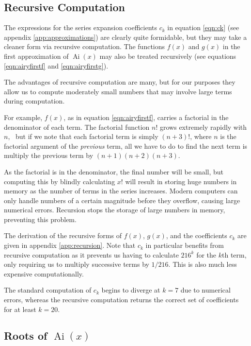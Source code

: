 \documentclass[]{article}
\newcommand{\Ai}[1]{\ensuremath{\operatorname{Ai}({#1})}}
\begin{document}
\subsection{Recursive Computation}\label{ssec:recursion}

The expressions for the series expansion coefficients $c_{k}$ in equation \ref{eqn:ck} (see appendix \ref{app:approximations}) are clearly quite formidable, but they may take a cleaner form via recursive computation. The functions $f(x)$ and $g(x)$ in the first approximation of $\Ai{x}$ may also be treated recursively (see equations \ref{eqn:airyfirstf} and \ref{eqn:airyfirstg}).

The advantages of recursive computation are many, but for our purposes they allow us to compute moderately small numbers that may involve large terms during computation.

For example, $f(x)$, as in equation \ref{eqn:airyfirstf}, carries a factorial in the denominator of each term. The factorial function $n!$ grows extremely rapidly with $n$,\footnotemark~ but if we note that each factorial term is simply $(n+3)!$, where $n$ is the factorial argument of the \emph{previous} term, all we have to do to find the next term is multiply the previous term by $(n+1)(n+2)(n+3)$.


As the factorial is in the denominator, the final number will be small, but computing this by blindly calculating $x!$ will result in storing huge numbers in memory as the number of terms in the series increases. Modern computers can only handle numbers of a certain magnitude before they overflow, causing large numerical errors. Recursion stops the storage of large numbers in memory, preventing this problem.

The derivation of the recursive forms of $f(x)$, $g(x)$, and the coefficients $c_{k}$ are given in appendix \ref{app:recursion}. Note that $c_{k}$ in particular benefits from recursive computation as it prevents us having to calculate $216^{k}$ for the $k$th term, only requiring us to multiply successive terms by $1/216$. This is also much less expensive computationally. 

The standard computation of $c_{k}$ begins to diverge at $k = 7$ due to numerical errors, whereas the recursive computation returns the correct set of coefficients for at least $k = 20$.

\subsection{Roots of \Ai{x}}
\end{document}
